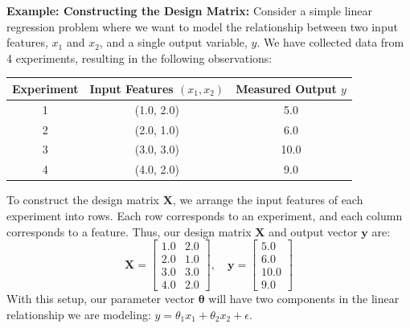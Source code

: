 \begin{exampleBox}
\textbf{Example: Constructing the Design Matrix:}
Consider a simple linear regression problem where we want to model the relationship between two input features, $x_1$ and $x_2$, and a single output variable, $y$. We have collected data from 4 experiments, resulting in the following observations:
\begin{table}[H]
    \centering
    \begin{tabular}{ccc}
        \toprule
        Experiment & Input Features $(x_1, x_2)$ & Measured Output $y$ \\
        \midrule
        1 & (1.0, 2.0) & 5.0 \\
        2 & (2.0, 1.0) & 6.0 \\
        3 & (3.0, 3.0) & 10.0 \\
        4 & (4.0, 2.0) & 9.0 \\
        \bottomrule
    \end{tabular}
\end{table}
To construct the design matrix $\mathbf{X}$, we arrange the input features of each experiment into rows. Each row corresponds to an experiment, and each column corresponds to a feature. Thus, our design matrix $\mathbf{X}$ and output vector $\mathbf{y}$ are:
\begin{equation}
    \mathbf{X} =
    \begin{bmatrix}
        1.0 & 2.0 \\
        2.0 & 1.0 \\
        3.0 & 3.0 \\
        4.0 & 2.0
    \end{bmatrix}, \quad
    \mathbf{y} =
    \begin{bmatrix}
        5.0 \\
        6.0 \\
        10.0 \\
        9.0
    \end{bmatrix}
\end{equation}
With this setup, our parameter vector $\boldsymbol{\theta}$ will have two components in the linear relationship we are modeling: $y = \theta_1 x_1 + \theta_2 x_2 + \epsilon$.



\end{exampleBox}
